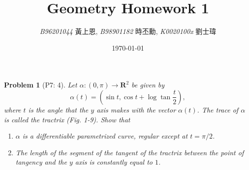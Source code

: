 \documentclass[12pt,a4paper]{article}
\newcounter{theProblemCounter}
\newtheorem{problem}[theProblemCounter]{Problem}
\begin{document}
\title{Geometry Homework 1}
\author{{\it{B96201044}} 黃上恩, {\it{B98901182}} 時丕勳, {\it{K0020100x}} 劉士瑋}
\date{\today}
\maketitle

\setcounter{theProblemCounter}{2}
\begin{problem}[P7: 4]
Let $\alpha:(0, \pi)\to \mathbf{R}^2$ be given by
\[ \alpha(t) = \left(\sin t, \cos t + \log\tan\frac{t}{2}\right),\] %
where $t$ is the angle that the $y$ axis makes with the vector $\alpha(t)$. The trace of $\alpha$ is called the \emph{tractrix} (Fig. 1-9). Show that
\begin{enumerate}
\item[(a)] $\alpha$ is a differentiable parametrized curve, regular except at $t=\pi/2$.
\item[(b)] The length of the segment of the tangent of the tractrix between the point of tangency and the $y$ axis is constantly equal to $1$.
\end{enumerate}
\end{problem}
\end{document}
